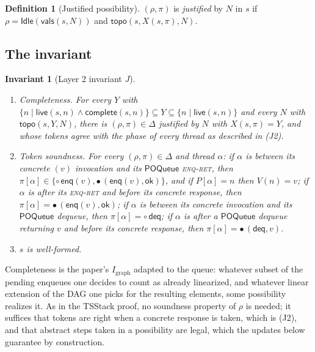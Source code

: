 \documentclass[11pt]{article}
\newtheorem{invariant}[lemma]{Invariant}
\theoremstyle{definition}
\newtheorem{definition}[lemma]{Definition}
\theoremstyle{remark}
\newcommand{\Idle}{\mathsf{Idle}}
\newcommand{\Enq}{\mathsf{enq}}
\newcommand{\Deq}{\mathsf{deq}}
\newcommand{\ok}{\mathsf{ok}}
\newcommand{\live}{\mathsf{live}}
\newcommand{\complete}{\mathsf{complete}}
\newcommand{\topo}{\mathsf{topo}}
\newcommand{\vals}{\mathsf{vals}}
\newcommand{\poss}{\Delta}
\newcommand{\abst}{\rho}
\newcommand{\tokens}{\pi}
\newcommand{\code}[1]{\texttt{\detokenize{#1}}}
\newcommand{\POQueue}{\mathsf{POQueue}}
\newcommand{\tok}[1]{\circ\,#1}
\newcommand{\done}[2]{\bullet\,(#1,#2)}
\begin{document}
\begin{definition}[Justified possibility]
$(\abst, \tokens)$ is \emph{justified} by $N$ in $s$ if $\abst =
\Idle(\vals(s, N))$ and $\topo(s, X(s, \tokens), N)$.
\end{definition}

\subsection{The invariant}

\begin{invariant}[Layer 2 invariant $J$]\label{inv:layer2}
\begin{enumerate}[label=(J\arabic*),nosep]
\item \emph{Completeness.}  For every $Y$ with
  $\{n \mid \live(s,n) \wedge \complete(s,n)\} \subseteq Y \subseteq
  \{n \mid \live(s,n)\}$ and every $N$ with $\topo(s, Y, N)$, there is
  $(\abst, \tokens) \in \poss$ justified by $N$ with $X(s, \tokens) = Y$,
  and whose tokens agree with the \emph{phase} of every thread as described
  in (J2).
\item \emph{Token soundness.}  For every $(\abst, \tokens) \in \poss$ and
  thread $\alpha$:
  if $\alpha$ is between its concrete \code{enq}$(v)$ invocation and its
  $\POQueue$ \textsc{enq-ret}, then $\tokens[\alpha] \in \{\tok{\Enq(v)},
  \done{\Enq(v)}{\ok}\}$, and if $P[\alpha] = n$ then $V(n) = v$;
  if $\alpha$ is after its \textsc{enq-ret} and before its concrete response,
  then $\tokens[\alpha] = \done{\Enq(v)}{\ok}$;
  if $\alpha$ is between its concrete \code{deq} invocation and its
  $\POQueue$ dequeue, then $\tokens[\alpha] = \tok{\Deq}$;
  if $\alpha$ is after a $\POQueue$ dequeue returning $v$ and before its
  concrete response, then $\tokens[\alpha] = \done{\Deq}{v}$.
\item $s$ is well-formed.
\end{enumerate}
\end{invariant}

Completeness is the paper's $I_{\mathrm{graph}}$ adapted to the queue:
whatever subset of the pending enqueues one decides to count as already
linearized, and whatever linear extension of the DAG one picks for the
resulting elements, some possibility realizes it.  As in the TSStack proof,
no soundness property of $\abst$ is needed; it suffices that tokens are
right when a concrete response is taken, which is (J2), and that abstract
steps taken in a possibility are legal, which the updates below guarantee by
construction.
\end{document}
